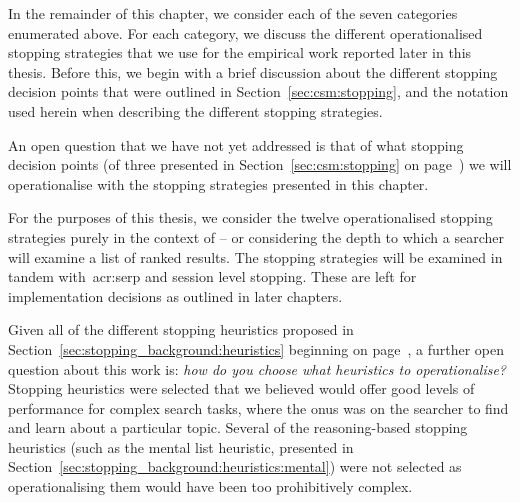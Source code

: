 In the remainder of this chapter, we consider each of the seven categories enumerated above. For each category, we discuss the different operationalised stopping strategies that we use for the empirical work reported later in this thesis. Before this, we begin with a brief discussion about the different stopping decision points that were outlined in Section~\ref{sec:csm:stopping}, and the notation used herein when describing the different stopping strategies.

An open question that we have not yet addressed is that of what stopping decision points (of three presented in Section~\ref{sec:csm:stopping} on page~\pageref{sec:csm:stopping}) we will operationalise with the stopping strategies presented in this chapter.

For the purposes of this thesis, we consider the twelve operationalised stopping strategies purely in the context of  -- or considering the depth to which a searcher will examine a list of ranked results. The stopping strategies will be examined in tandem with~\gls{acr:serp} and session level stopping. These are left for implementation decisions as outlined in later chapters.

Given all of the different stopping heuristics proposed in Section~\ref{sec:stopping_background:heuristics} beginning on page~\pageref{sec:stopping_background:heuristics}, a further open question about this work is: \emph{how do you choose what heuristics to operationalise?} Stopping heuristics were selected that we believed would offer good levels of performance for complex search tasks, where the onus was on the searcher to find and learn about a particular topic. Several of the reasoning-based stopping heuristics (such as the mental list heuristic, presented in Section~\ref{sec:stopping_background:heuristics:mental}) were not selected as operationalising them would have been too prohibitively complex.

